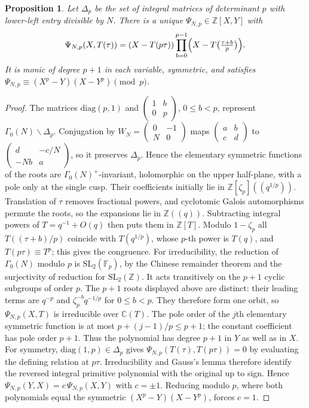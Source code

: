 \documentclass[11pt,a4paper]{article}
\numberwithin{equation}{section}
\newtheorem{proposition}[theorem]{Proposition}
\theoremstyle{definition}
\theoremstyle{remark}
\newcommand{\Fp}{\mathbb F_p}
\newcommand{\Z}{\mathbb Z}
\begin{document}
\begin{proposition}\label{prop:Psi}
Let $\Delta_p$ be the set of integral matrices of determinant $p$ with lower-left entry divisible by
$N$. There is a unique $\Psi_{N,p}\in\Z[X,Y]$ with
\[
\Psi_{N,p}(X,T(\tau))=(X-T(p\tau))\prod_{b=0}^{p-1}\Bigl(X-T\bigl(\tfrac{\tau+b}{p}\bigr)\Bigr).
\]
It is monic of degree $p+1$ in each variable, symmetric, and satisfies
$\Psi_{N,p}\equiv(X^p-Y)(X-Y^p)\pmod p$.
\end{proposition}
\begin{proof}
The matrices $\mathrm{diag}(p,1)$ and $\begin{pmatrix}1&b\\0&p\end{pmatrix}$, $0\le b<p$, represent
$\Gamma_0(N)\backslash\Delta_p$. Conjugation by $W_N=\begin{pmatrix}0&-1\\N&0\end{pmatrix}$ maps
$\begin{pmatrix}a&b\\c&d\end{pmatrix}$ to $\begin{pmatrix}d&-c/N\\-Nb&a\end{pmatrix}$, so it preserves
$\Delta_p$. Hence the elementary symmetric functions of the roots are $\Gamma_0(N)^+$-invariant,
holomorphic on the upper half-plane, with a pole only at the single cusp.
Their coefficients initially lie in $\Z[\zeta_p]((q^{1/p}))$.
Translation of $\tau$ removes fractional powers, and cyclotomic Galois automorphisms
permute the roots, so the expansions lie in $\Z((q))$.
Subtracting integral powers of $T=q^{-1}+O(q)$ then puts them in $\Z[T]$. Modulo $1-\zeta_p$ all $T((\tau+b)/p)$ coincide with $T(q^{1/p})$, whose $p$-th power is $T(q)$, and
$T(p\tau)\equiv T^p$; this gives the congruence. For irreducibility, the reduction of $\Gamma_0(N)$ modulo $p$ is
$\mathrm{SL}_2(\Fp)$, by the Chinese remainder theorem and the surjectivity of reduction
for $\mathrm{SL}_2(\Z)$. It acts transitively on the $p+1$ cyclic subgroups of order $p$.
The $p+1$ roots displayed above are distinct: their leading terms are $q^{-p}$ and
$\zeta_p^{-b}q^{-1/p}$ for $0\le b<p$. They therefore form one orbit, so
$\Psi_{N,p}(X,T)$ is irreducible over $\mathbb C(T)$.
The pole order of the $j$th elementary symmetric function is at most
$p+(j-1)/p\le p+1$; the constant coefficient has pole order $p+1$.
Thus the polynomial has degree $p+1$ in $Y$ as well as in $X$.
For symmetry, $\mathrm{diag}(1,p)\in\Delta_p$ gives
$\Psi_{N,p}(T(\tau),T(p\tau))=0$ by evaluating the defining relation at $p\tau$.
Irreducibility and Gauss's lemma therefore identify the reversed integral primitive
polynomial with the original up to sign.
Hence $\Psi_{N,p}(Y,X)=c\,\Psi_{N,p}(X,Y)$ with $c=\pm1$. Reducing modulo $p$, where both polynomials
equal the symmetric $(X^p-Y)(X-Y^p)$, forces $c=1$.
\end{proof}
\end{document}
